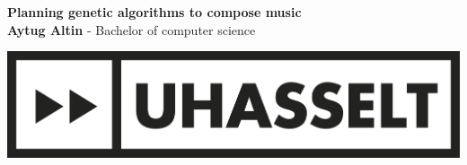 \documentclass[a0,portrait]{a0poster}
\begin{document}




\begin{minipage}[t]{0.60\linewidth}
\vspace{0.1cm}
\begin{flushleft}
	\Huge \color{ku} \textbf{Planning genetic algorithms to compose	music} \color{Black}\\ %
\LARGE\textbf{Aytug Altin} - \Large Bachelor of computer science %
\end{flushleft}


\end{minipage}
%
\begin{minipage}[t]{0.40\linewidth}
\vspace{0.1cm}
\flushright
\begin{center}
	\includegraphics[width=0.6\linewidth]{UHasselt-liggend}
\end{center}
\end{minipage}


\end{document}
